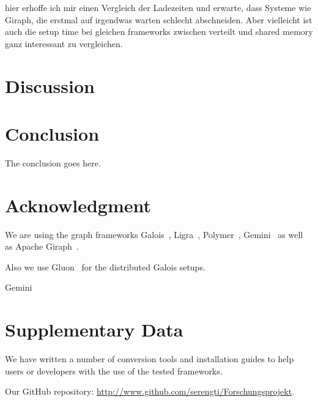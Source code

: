 \documentclass[conference,a4paper]{IEEEtran}
\begin{document}
hier erhoffe ich mir einen Vergleich der Ladezeiten und erwarte, dass Systeme wie Giraph, die erstmal auf irgendwas warten schlecht abschneiden.
Aber vielleicht ist auch die setup time bei gleichen frameworks zwischen verteilt und shared memory ganz interessant zu vergleichen. 



\section{Discussion}




\section{Conclusion}
The conclusion goes here.



\section*{Acknowledgment}
We are using the graph frameworks Galois~\cite{Galois}, Ligra~\cite{Ligra}, Polymer~\cite{Polymer}, Gemini~\cite{Gemini} as well as Apache Giraph~\cite{Giraph}.

Also we use Gluon~\cite{vertGalois} for the distributed Galois setups.

Gemini~\cite{Gemini}


\section*{Supplementary Data}\label{supplementaryData}
We have written a number of conversion tools and installation guides to help
users or developers with the use of the tested frameworks.

Our GitHub repository: \url{http://www.github.com/serengti/Forschungsprojekt}.





\end{document}
